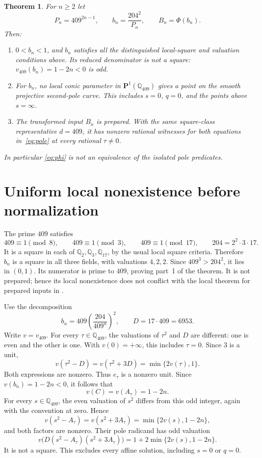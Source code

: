 \documentclass[11pt,a4paper]{article}
\newtheorem{theorem}{Theorem}[section]
\newcommand{\Q}{\mathbb Q}
\begin{document}
\begin{samepage}
\begin{theorem}\label{thm:obstruction}
For $n\ge2$ let
\[
 P_n=409^{2n-1},\qquad b_n=\frac{204^2}{P_n},\qquad B_n=\Phi(b_n).
\]
Then:
\begin{enumerate}
\item $0<b_n<1$, and $b_n$ satisfies all the distinguished local-square
      and valuation conditions above. Its reduced denominator is not
      a square: $v_{409}(b_n)=1-2n<0$ is odd.
\item For $b_n$, no local conic parameter in $\mathbf P^1(\Q_{409})$
      gives a point on the smooth projective second-pole curve. This
      includes $s=0$, $q=0$, and the points above $s=\infty$.
\item The transformed input $B_n$ is prepared. With the same
      square-class representative $d=409$, it has nonzero rational
      witnesses for both equations in~\eqref{eq:pole} at every
      rational $\tau\ne0$.
\end{enumerate}
In particular \eqref{eq:phi} is not an equivalence of the isolated
pole predicates.
\end{theorem}
\end{samepage}

\section{Uniform local nonexistence before normalization}

The prime $409$ satisfies
\[
 409\equiv1\pmod8,\qquad409\equiv1\pmod3,\qquad
 409\equiv1\pmod{17},\qquad204=2^2\cdot3\cdot17.
\]
It is a square in each of $\Q_2,\Q_3,\Q_{17}$, by the usual
local square criteria. Therefore $b_n$ is a square in all three fields,
with valuations $4,2,2$. Since $409^3>204^2$, it lies in $(0,1)$.
Its numerator is prime to $409$, proving part~1 of the theorem.
It is not prepared; hence its local nonexistence does not conflict
with the local theorem for prepared inputs in \cite{Local}.

Use the decomposition
\[
        b_n=409\left(\frac{204}{409^n}\right)^2,
        \qquad D=17\cdot409=6953.
\]
Write $v=v_{409}$. For every $\tau\in\Q_{409}$, the valuations
of $\tau^2$ and $D$ are different: one is even and the other is one.
With $v(0)=+\infty$, this includes $\tau=0$. Since $3$ is a unit,
\[
 v(\tau^2-D)=v(\tau^2+3D)=\min\{2v(\tau),1\}.
\]
Both expressions are nonzero. Thus $e_\tau$ is a nonzero unit.
Since $v(b_n)=1-2n<0$, it follows that
\begin{equation}\label{eq:A}
                 v(C)=v(A_\tau)=1-2n.
\end{equation}
For every $s\in\Q_{409}$, the even valuation of $s^2$ differs
from this odd integer, again with the convention at zero. Hence
\[
 v(s^2-A_\tau)=v(s^2+3A_\tau)
                  =\min\{2v(s),1-2n\},
\]
and both factors are nonzero. Their pole radicand has odd valuation
\begin{equation}\label{eq:odd}
 v\bigl(D(s^2-A_\tau)(s^2+3A_\tau)\bigr)
                  =1+2\min\{2v(s),1-2n\}.
\end{equation}
It is not a square. This excludes every affine solution, including
$s=0$ or $q=0$.
\end{document}
